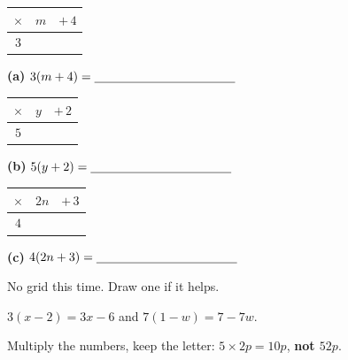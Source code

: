 \documentclass[12pt,a4paper]{article}
\begin{document}
\noindent
\begin{minipage}[c]{0.26\textwidth}
  \begin{tabular}{|c|c|c|}
    \hline
    $\times$ & $m$ & $+\,4$ \\ \hline
    $3$      &     &        \\ \hline
  \end{tabular}
\end{minipage}%
\begin{minipage}[c]{0.72\textwidth}
  \textbf{(a)} \; $3(m + 4) = \blank[4.0cm]$
\end{minipage}

\vspace{13pt}
\noindent
\begin{minipage}[c]{0.26\textwidth}
  \begin{tabular}{|c|c|c|}
    \hline
    $\times$ & $y$ & $+\,2$ \\ \hline
    $5$      &     &        \\ \hline
  \end{tabular}
\end{minipage}%
\begin{minipage}[c]{0.72\textwidth}
  \textbf{(b)} \; $5(y + 2) = \blank[4.0cm]$
\end{minipage}

\vspace{13pt}
\noindent
\begin{minipage}[c]{0.26\textwidth}
  \begin{tabular}{|c|c|c|}
    \hline
    $\times$ & $2n$ & $+\,3$ \\ \hline
    $4$      &      &        \\ \hline
  \end{tabular}
\end{minipage}%
\begin{minipage}[c]{0.72\textwidth}
  \textbf{(c)} \; $4(2n + 3) = \blank[4.0cm]$
\end{minipage}
\renewcommand{\arraystretch}{1.45}%


\noindent No grid this time. Draw one if it helps.

\begin{remember}
   \; $3(x - 2) = 3x - 6$ \quad and \quad $7(1 - w) = 7 - 7w$.

  \smallskip
   Multiply the numbers, keep the
  letter: \; $5 \times 2p = 10p$, \; {\color{cbred}\bfseries not $52p$}.
\end{remember}
\end{document}
